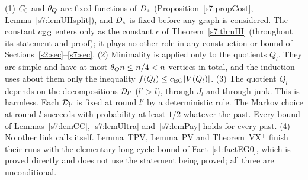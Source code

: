 \begin{remark}\label{s7:remNonCirc}
(1) $C_{0}$ and $\theta_{Q}$ are fixed functions of $D_{*}$
(Proposition~\ref{s7:propCost}, Lemma~\ref{s7:lemUHsplit}), and $D_{*}$ is fixed
before any graph is considered. The constant $c_{\mathrm{EG}}$ enters only as the
constant $c$ of Theorem~\ref{s7:thmHI} (throughout its statement and
proof); it plays no other role in any construction or bound of
Sections~\ref{s2:sec}--\ref{s7:sec}.
(2) Minimality is applied only to the quotients $Q_l$. They are simple and have
at most $\theta_{Q} n\le n/4<n$ vertices in total, and the induction uses about
them only the inequality $f(Q_l)\le c_{\mathrm{EG}}|V(Q_l)|$.
(3) The quotient $Q_l$ depends on the decompositions $\mathcal{D}_{l'}$ ($l'>l$), through
$J_l$ and through junk. This is harmless. Each $\mathcal{D}_{l'}$ is fixed at round $l'$
by a deterministic rule. The Markov choice at round $l$ succeeds with
probability at least $1/2$ whatever the past. Every bound of
Lemmas~\ref{s7:lemCC}, \ref{s7:lemUltra} and~\ref{s7:lemPay} holds for every
past.
(4) No other link calls itself. Lemma~TPV, Lemma~PV and Theorem~VX$^+$
finish their runs with the elementary long-cycle bound of
Fact~\ref{s1:factEG0}, which is proved directly and does not use the statement
being proved; all three are unconditional.
\deps{\ref{s7:thmHI}, \ref{s7:thmJVps}, \ref{s7:propCost}, \ref{s7:lemUHsplit}, \ref{s7:lemCC}, \ref{s7:lemUltra}, \ref{s7:lemPay}, \ref{s7:lemSimple}, \ref{s7:consRound}, \ref{s4:lemTPV}, \ref{s4:lemPV}, \ref{s4:thmVXp}, \ref{s1:condG4}, \ref{s1:factEG0}}
\end{remark}
